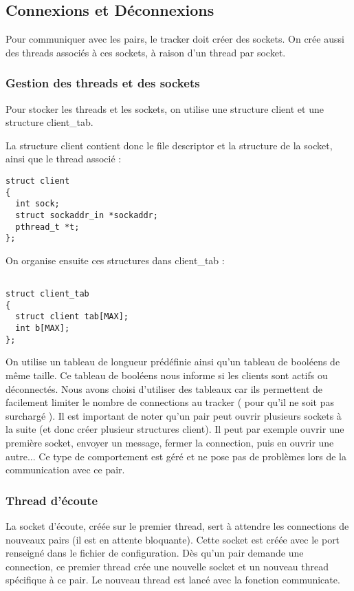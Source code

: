\subsection{Connexions et Déconnexions}

Pour communiquer avec les pairs, le tracker doit créer des sockets. On crée aussi des threads associés à ces sockets, à raison d'un thread par socket.
\subsubsection{Gestion des threads et des sockets}
Pour stocker les threads et les sockets, on utilise une structure client et une structure client\_tab.

La structure client contient donc le file descriptor et la structure de la socket, ainsi que le thread associé :
\begin{verbatim}
struct client
{
  int sock;
  struct sockaddr_in *sockaddr;
  pthread_t *t; 
};
\end{verbatim}
On organise ensuite ces structures dans client\_tab :
\begin{verbatim}

struct client_tab
{
  struct client tab[MAX];
  int b[MAX];
};
\end{verbatim}
On utilise un tableau de longueur prédéfinie ainsi qu'un tableau de booléens de même taille. Ce tableau de booléens nous informe si les clients sont actifs ou déconnectés.
Nous avons choisi d'utiliser des tableaux car ils permettent de facilement limiter le nombre de connections au tracker ( pour qu'il ne soit pas surchargé ). Il est important de noter qu'un pair peut ouvrir plusieurs sockets à la suite (et donc créer plusieur structures client). Il peut par exemple ouvrir une première socket, envoyer un message, fermer la connection, puis en ouvrir une autre... Ce type de comportement est géré et ne pose pas de problèmes lors de la communication avec ce pair.

\subsubsection{Thread d'écoute}
La socket d'écoute, créée sur le premier thread, sert à attendre les connections de nouveaux pairs (il est en attente bloquante). Cette socket est créée avec le port renseigné dans le fichier de configuration. Dès qu'un pair demande une connection, ce premier thread crée une nouvelle socket et un nouveau thread spécifique à ce pair.
Le nouveau thread est lancé avec la fonction communicate.
